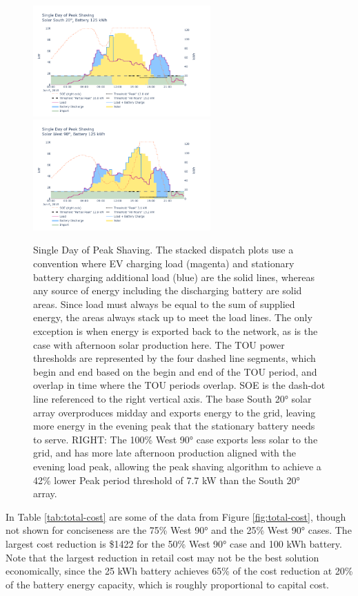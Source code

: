 \documentclass[journal,article,submit,pdftex,moreauthors]{Definitions/mdpi}
\begin{document}
\begin{figure}[!h]
  \centering
  \includegraphics[width=6.8cm]{./images/single day of peak shaving south.png}
  \includegraphics[width=6.8cm]{./images/single day of peak shaving west.png}
  \caption{Single Day of Peak Shaving. The stacked
  dispatch plots use a convention where EV charging load (magenta) and
  stationary battery charging additional load (blue) are the solid lines,
  whereas any source of energy including the discharging battery are solid
  areas. Since load must always be equal to the sum of supplied energy,
  the areas always stack up to meet the load lines. The only exception is
  when energy is exported back to the network, as is the case with
  afternoon solar production here. The TOU power thresholds are
  represented by the four dashed line segments, which begin and end based
  on the begin and end of the TOU period, and overlap in time where the
  TOU periods overlap. SOE is the dash-dot line referenced to the right
  vertical axis. The base South 20° solar array overproduces midday
  and exports energy to the grid, leaving more energy in the evening peak
  that the stationary battery needs to serve.
  RIGHT: The 100\% West 90°
  case exports less solar to the grid, and has more late afternoon
  production aligned with the evening load peak, allowing the peak shaving
  algorithm to achieve a 42\% lower Peak period threshold of 7.7 kW than
  the South 20° array.}
  \label{fig:peak-shaving}
\end{figure}



In Table \ref{tab:total-cost} are some of the data from Figure \ref{fig:total-cost}, though not shown for
conciseness are the 75\% West 90° and the 25\% West 90° cases. The
largest cost reduction is \$1422 for the 50\% West 90° case and 100 kWh
battery. Note that the largest reduction in retail cost may not be the
best solution economically, since the 25 kWh battery achieves 65\% of
the cost reduction at 20\% of the battery energy capacity, which is
roughly proportional to capital cost.
\end{document}
